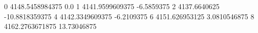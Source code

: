 0 4148.5458984375 0.0
1 4141.9599609375 -6.5859375
2 4137.6640625 -10.8818359375
4 4142.3349609375 -6.2109375
6 4151.626953125 3.0810546875
8 4162.2763671875 13.73046875
